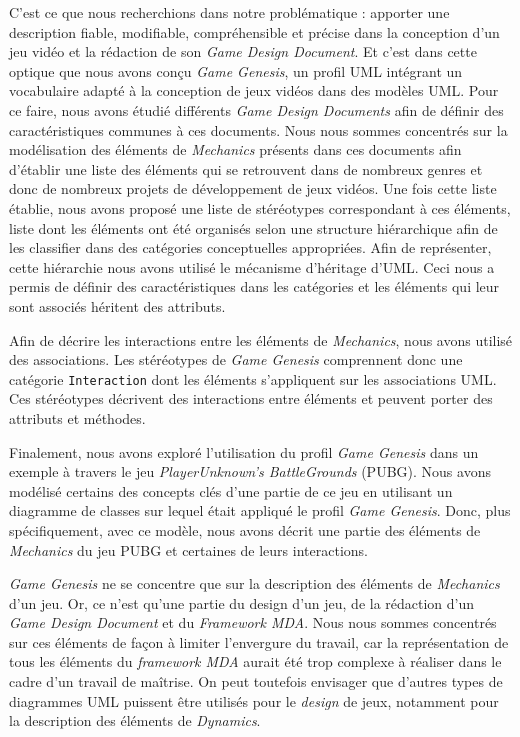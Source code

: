 \begin{conclusion}



C'est ce que nous recherchions dans notre problématique : apporter une description fiable, modifiable, compréhensible et précise dans la conception d'un jeu vidéo et la rédaction de son \emph{Game Design Document}.
%
Et c'est dans cette optique que nous avons conçu \emph{Game Genesis}, un profil UML intégrant un vocabulaire adapté à la conception de jeux vidéos dans des modèles UML.
%
Pour ce faire, 
nous avons étudié différents \emph{Game Design Documents} afin de définir des caractéristiques communes à ces documents.
Nous nous sommes concentrés sur la modélisation des éléments de \emph{Mechanics} présents dans ces documents afin d'établir une liste des éléments qui se retrouvent dans de nombreux genres et donc de nombreux projets de développement de jeux vidéos.
Une fois cette liste établie, nous avons proposé une liste de stéréotypes correspondant à ces éléments, 
liste dont les éléments ont été organisés selon une structure hiérarchique afin de les classifier dans des catégories conceptuelles appropriées.
Afin de représenter, cette hiérarchie nous avons utilisé le mécanisme d'héritage d'UML.
Ceci nous a permis de définir des caractéristiques dans les catégories et les éléments qui leur sont associés héritent des attributs.

Afin de décrire les interactions entre les éléments de \emph{Mechanics}, nous avons utilisé des associations.
Les stéréotypes de \emph{Game Genesis} comprennent donc une catégorie \texttt{Interaction} dont les éléments s'appliquent sur les associations UML.
Ces stéréotypes décrivent des interactions entre éléments et peuvent porter des attributs et méthodes.

Finalement, nous avons exploré l'utilisation du profil \emph{Game Genesis} dans un exemple à travers le jeu \emph{PlayerUnknown's BattleGrounds} (PUBG).
Nous avons modélisé certains des concepts clés d'une partie de ce jeu en utilisant un diagramme de classes sur lequel était appliqué le profil \emph{Game Genesis}.
Donc, plus spécifiquement, avec ce modèle, nous avons décrit une partie des éléments de \emph{Mechanics} du jeu PUBG et certaines de leurs interactions.

\emph{Game Genesis} ne se concentre que sur la description des éléments de \emph{Mechanics} d'un jeu.
Or, ce n'est qu'une partie du design d'un jeu, de la rédaction d'un \emph{Game Design Document} et du \emph{Framework MDA}.
Nous nous sommes concentrés sur ces éléments de façon à limiter l'envergure du travail, car la représentation de tous les éléments du \emph{framework MDA} aurait été trop complexe à réaliser dans le cadre d'un travail de maîtrise.
%
On peut toutefois envisager que d'autres types de diagrammes UML
puissent être utilisés pour le \emph{design} de jeux, notamment
pour la description des éléments de \emph{Dynamics}.


\end{conclusion}
